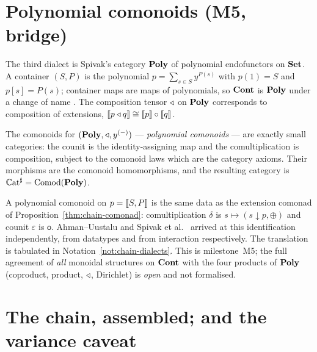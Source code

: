 \section{Polynomial comonoids (M5, bridge)}\label{sec:chain-poly}

The third dialect is Spivak's category $\mathbf{Poly}$ of polynomial endofunctors on
$\mathbf{Set}$. A container $(S,P)$ is the polynomial $p=\sum_{s\in S}y^{P(s)}$ with
$p(1)=S$ and $p[s]=P(s)$; container maps are maps of polynomials, so $\mathbf{Cont}$ is
$\mathbf{Poly}$ under a change of name \cite{NiuSpivak,GambinoKock}. The composition
tensor $\triangleleft$ on $\mathbf{Poly}$ corresponds to composition of extensions,
$\llbracket p\triangleleft q \rrbracket\cong\llbracket p \rrbracket\circ\llbracket q \rrbracket$.

\begin{theorem}\label{thm:chain-poly}
The comonoids for $(\mathbf{Poly},\triangleleft,y^{(-)})$ --- \emph{polynomial comonoids} --- are
exactly small categories: the counit is the identity-assigning map and the
comultiplication is composition, subject to the comonoid laws which are the
category axioms. Their morphisms are the comonoid homomorphisms, and the
resulting category is $\mathbb C\mathrm{at}^{\sharp}=\mathrm{Comod}(\mathbf{Poly})$.
\end{theorem}

\begin{remark}\label{rem:chain-poly}
A polynomial comonoid on $p=\llbracket S,P \rrbracket$ is the same data as the extension comonad
of Proposition~\ref{thm:chain-comonad}: comultiplication $\delta$ is
$s\mapsto(s\downarrow p,\oplus)$ and counit $\varepsilon$ is $\mathsf o$.
Ahman--Uustalu \cite{ACU14,AU16} and Spivak et al.\ \cite{Spi21,SS23} arrived at
this identification independently, from datatypes and from interaction
respectively. The translation is tabulated in
Notation~\ref{not:chain-dialects}. This is milestone~M5; the full agreement of
\emph{all} monoidal structures on $\mathbf{Cont}$ with the four products of $\mathbf{Poly}$
(coproduct, product, $\triangleleft$, Dirichlet) is \emph{open} and not formalised.
\end{remark}

\section{The chain, assembled; and the variance caveat}\label{sec:chain-assembled}

